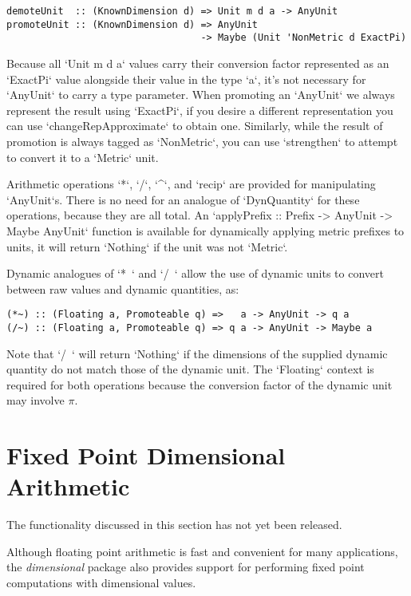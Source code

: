 \documentclass[11pt]{report}
\newcommand{\packagename}[1]{\textit{#1}}
\newcommand{\thispackage}{\packagename{dimensional}}
\newcommand{\prerelease}{\begin{framed}
The functionality discussed in this section has not yet been released.
\end{framed}}
\begin{document}
\begin{lstlisting}
demoteUnit  :: (KnownDimension d) => Unit m d a -> AnyUnit
promoteUnit :: (KnownDimension d) => AnyUnit
                                  -> Maybe (Unit 'NonMetric d ExactPi)
\end{lstlisting}

Because all `Unit m d a` values carry their conversion factor represented as an `ExactPi` value alongside their value in
the type `a`, it's not necessary for `AnyUnit` to carry a type parameter. When promoting an `AnyUnit` we always represent
the result using `ExactPi`, if you desire a different representation you can use `changeRepApproximate` to obtain one.
Similarly, while the result of promotion is always tagged as `NonMetric`, you can use `strengthen` to attempt to convert
it to a `Metric` unit.

Arithmetic operations `*`, `/`, `^`, and `recip` are provided for manipulating `AnyUnit`s. There is no need for an analogue
of `DynQuantity` for these operations, because they are all total. An `applyPrefix :: Prefix -> AnyUnit -> Maybe AnyUnit`
function is available for dynamically applying metric prefixes to units, it will return `Nothing` if the unit was not `Metric`.

Dynamic analogues of `*~` and `/~` allow the use of dynamic units to convert between raw values and dynamic quantities, as:

\begin{lstlisting}
(*~) :: (Floating a, Promoteable q) =>   a -> AnyUnit -> q a
(/~) :: (Floating a, Promoteable q) => q a -> AnyUnit -> Maybe a
\end{lstlisting}

Note that `/~` will return `Nothing` if the dimensions of the supplied dynamic quantity do not match those of the
dynamic unit. The `Floating` context is required for both operations because the conversion factor of the
dynamic unit may involve $ \pi $.



\chapter{Fixed Point Dimensional Arithmetic}

\prerelease{}

Although floating point arithmetic is fast and convenient for many applications, the \thispackage{} package also provides
support for performing fixed point computations with dimensional values.
\end{document}
